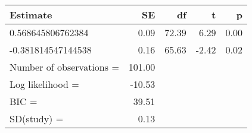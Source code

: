 \begin{table}[ht]
\centering
\begin{tabular}{lrrrr}
  \hline
Estimate & SE & df & t & p \\ 
  \hline
0.568645806762384 & 0.09 & 72.39 & 6.29 & 0.00 \\ 
  -0.381814547144538 & 0.16 & 65.63 & -2.42 & 0.02 \\ 
  Number of observations = & 101.00 &  &  &  \\ 
  Log likelihood = & -10.53 &  &  &  \\ 
  BIC = & 39.51 &  &  &  \\ 
  SD(study) = & 0.13 &  &  &  \\ 
   \hline
\end{tabular}
\end{table}
